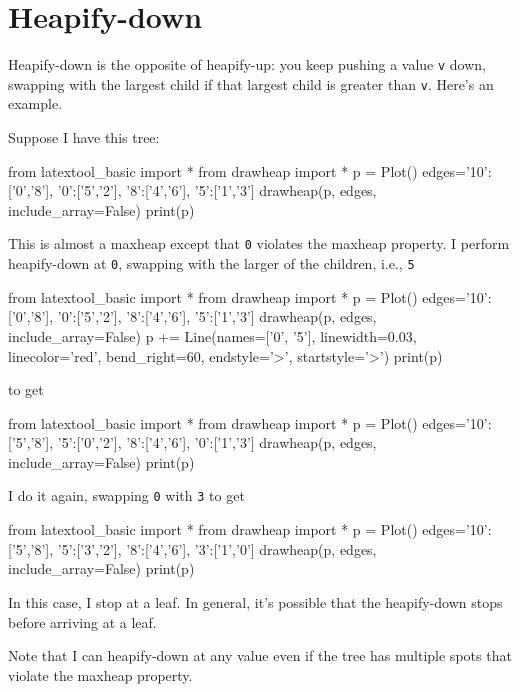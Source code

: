 \section{Heapify-down}

Heapify-down is the opposite of heapify-up:
you keep pushing a value \verb!v! down, swapping with the largest child
if that largest child is greater than \verb!v!. 
Here's an example.

Suppose I have this tree:

\begin{python}
from latextool_basic import *
from drawheap import *
p = Plot()
edges={'10':['0','8'],
       '0':['5','2'],
       '8':['4','6'],
       '5':['1','3']
       }
drawheap(p, edges, include_array=False)
print(p)
\end{python}

This is almost a maxheap except that \verb!0!
violates the maxheap property.
I perform heapify-down at \verb!0!, swapping with
the larger of the children, i.e., \verb!5!


\begin{python}
from latextool_basic import *
from drawheap import *
p = Plot()
edges={'10':['0','8'],
       '0':['5','2'],
       '8':['4','6'],
       '5':['1','3']
       }
drawheap(p, edges, include_array=False)
p += Line(names=['0', '5'], linewidth=0.03, linecolor='red',
          bend_right=60, endstyle='>', startstyle='>')       
print(p)
\end{python}

to get


\begin{python}
from latextool_basic import *
from drawheap import *
p = Plot()
edges={'10':['5','8'],
       '5':['0','2'],
       '8':['4','6'],
       '0':['1','3']
       }
drawheap(p, edges, include_array=False)
print(p)
\end{python}

I do it again, swapping \verb!0! with \verb!3! to get

\begin{python}
from latextool_basic import *
from drawheap import *
p = Plot()
edges={'10':['5','8'],
       '5':['3','2'],
       '8':['4','6'],
       '3':['1','0']
       }
drawheap(p, edges, include_array=False)
print(p)
\end{python}

In this case, I stop at a leaf.
In general, it's possible that the heapify-down stops before
arriving at a leaf.

Note that I can heapify-down at any value even if
the tree has multiple spots that violate the
maxheap property.

